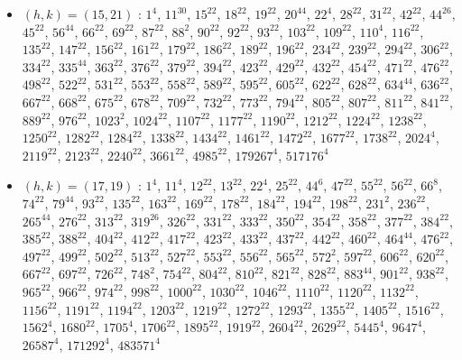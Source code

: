 \begin{itemize}
\item $(h,k)=(15,21)$ : $1^{4}$, $11^{30}$, $15^{22}$, $18^{22}$, $19^{22}$, $20^{44}$, $22^{4}$, $28^{22}$, $31^{22}$, $42^{22}$, $44^{26}$, $45^{22}$, $56^{44}$, $66^{22}$, $69^{22}$, $87^{22}$, $88^{2}$, $90^{22}$, $92^{22}$, $93^{22}$, $103^{22}$, $109^{22}$, $110^{4}$, $116^{22}$, $135^{22}$, $147^{22}$, $156^{22}$, $161^{22}$, $179^{22}$, $186^{22}$, $189^{22}$, $196^{22}$, $234^{22}$, $239^{22}$, $294^{22}$, $306^{22}$, $334^{22}$, $335^{44}$, $363^{22}$, $376^{22}$, $379^{22}$, $394^{22}$, $423^{22}$, $429^{22}$, $432^{22}$, $454^{22}$, $471^{22}$, $476^{22}$, $498^{22}$, $522^{22}$, $531^{22}$, $553^{22}$, $558^{22}$, $589^{22}$, $595^{22}$, $605^{22}$, $622^{22}$, $628^{22}$, $634^{44}$, $636^{22}$, $667^{22}$, $668^{22}$, $675^{22}$, $678^{22}$, $709^{22}$, $732^{22}$, $773^{22}$, $794^{22}$, $805^{22}$, $807^{22}$, $811^{22}$, $841^{22}$, $889^{22}$, $976^{22}$, $1023^{2}$, $1024^{22}$, $1107^{22}$, $1177^{22}$, $1190^{22}$, $1212^{22}$, $1224^{22}$, $1238^{22}$, $1250^{22}$, $1282^{22}$, $1284^{22}$, $1338^{22}$, $1434^{22}$, $1461^{22}$, $1472^{22}$, $1677^{22}$, $1738^{22}$, $2024^{4}$, $2119^{22}$, $2123^{22}$, $2240^{22}$, $3661^{22}$, $4985^{22}$, $179267^{4}$, $517176^{4}$
\item $(h,k)=(17,19)$ : $1^{4}$, $11^{4}$, $12^{22}$, $13^{22}$, $22^{4}$, $25^{22}$, $44^{6}$, $47^{22}$, $55^{22}$, $56^{22}$, $66^{8}$, $74^{22}$, $79^{44}$, $93^{22}$, $135^{22}$, $163^{22}$, $169^{22}$, $178^{22}$, $184^{22}$, $194^{22}$, $198^{22}$, $231^{2}$, $236^{22}$, $265^{44}$, $276^{22}$, $313^{22}$, $319^{26}$, $326^{22}$, $331^{22}$, $333^{22}$, $350^{22}$, $354^{22}$, $358^{22}$, $377^{22}$, $384^{22}$, $385^{22}$, $388^{22}$, $404^{22}$, $412^{22}$, $417^{22}$, $423^{22}$, $433^{22}$, $437^{22}$, $442^{22}$, $460^{22}$, $464^{44}$, $476^{22}$, $497^{22}$, $499^{22}$, $502^{22}$, $513^{22}$, $527^{22}$, $553^{22}$, $556^{22}$, $565^{22}$, $572^{2}$, $597^{22}$, $606^{22}$, $620^{22}$, $667^{22}$, $697^{22}$, $726^{22}$, $748^{2}$, $754^{22}$, $804^{22}$, $810^{22}$, $821^{22}$, $828^{22}$, $883^{44}$, $901^{22}$, $938^{22}$, $965^{22}$, $966^{22}$, $974^{22}$, $998^{22}$, $1000^{22}$, $1030^{22}$, $1046^{22}$, $1110^{22}$, $1120^{22}$, $1132^{22}$, $1156^{22}$, $1191^{22}$, $1194^{22}$, $1203^{22}$, $1219^{22}$, $1272^{22}$, $1293^{22}$, $1355^{22}$, $1405^{22}$, $1516^{22}$, $1562^{4}$, $1680^{22}$, $1705^{4}$, $1706^{22}$, $1895^{22}$, $1919^{22}$, $2604^{22}$, $2629^{22}$, $5445^{4}$, $9647^{4}$, $26587^{4}$, $171292^{4}$, $483571^{4}$

\end{itemize}
